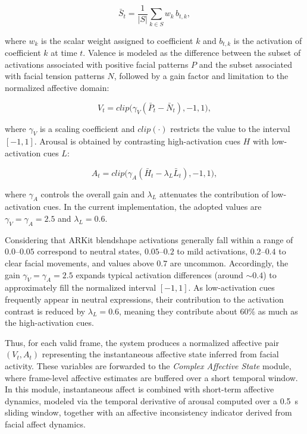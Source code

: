 \documentclass[letterpaper, 10 pt, conference]{ieeeconf}  %
\begin{document}
\begin{equation}
\bar{S}_t =
\frac{1}{|S|}
\sum_{k \in S} w_k\, b_{t,k},
\end{equation}

where $w_k$ is the scalar weight assigned to coefficient $k$ and $b_{t,k}$ is the activation of coefficient $k$ at time $t$. Valence is modeled as the difference between the subset of activations associated with positive facial patterns $P$ and the subset associated with facial tension patterns $N$, followed by a gain factor and limitation to the normalized affective domain:

\begin{equation}
V_t =
{clip}\big(
\gamma_V(\bar{P}_t-\bar{N}_t),
-1,1
\big),
\end{equation}

where $\gamma_V$ is a scaling coefficient and ${clip}(\cdot)$ restricts the value to the interval $[-1,1]$. Arousal is obtained by contrasting high-activation cues $H$ with low-activation cues $L$:

\begin{equation}
A_t =
{clip}\big(
\gamma_A(\bar{H}_t-\lambda_L\bar{L}_t),
-1,1
\big),
\end{equation}

where $\gamma_A$ controls the overall gain and $\lambda_L$ attenuates the contribution of low-activation cues. In the current implementation, the adopted values are $\gamma_V=\gamma_A=2.5$ and $\lambda_L=0.6$.

Considering that ARKit blendshape activations generally fall within a range of $0.0$--$0.05$ correspond to neutral states, $0.05$--$0.2$ to mild activations, $0.2$--$0.4$ to clear facial movements, and values above $0.7$ are uncommon. Accordingly, the gain $\gamma_V=\gamma_A=2.5$ expands typical activation differences (around $\sim0.4$) to approximately fill the normalized interval $[-1,1]$. As low-activation cues frequently appear in neutral expressions, their contribution to the activation contrast is reduced by $\lambda_L=0.6$, meaning they contribute about $60\%$ as much as the high-activation cues.

Thus, for each valid frame, the system produces a normalized affective pair $(V_t, A_t)$ representing the instantaneous affective state inferred from facial activity. These variables are forwarded to the \emph{Complex Affective State} module, where frame-level affective estimates are buffered over a short temporal window. In this module, instantaneous affect is combined with short-term affective dynamics, modeled via the temporal derivative of arousal computed over a 0.5~s sliding window, together with an affective inconsistency indicator derived from facial affect dynamics.
\end{document}
